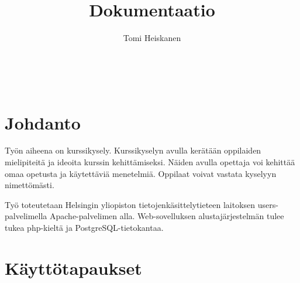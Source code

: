\documentclass[12pt,twoside,a4paper,leqno,titlepage]{article}
\title{Dokumentaatio}
\author{Tomi Heiskanen}
\begin{document}
\maketitle

\ 
\thispagestyle{empty}
\newpage

\setcounter{page}{1}
\tableofcontents
\thispagestyle{empty}

\newpage
\section{Johdanto}

Työn aiheena on kurssikysely. Kurssikyselyn avulla kerätään oppilaiden
mielipiteitä ja ideoita kurssin kehittämiseksi. Näiden avulla opettaja voi
kehittää omaa opetusta ja käytettäviä menetelmiä. Oppilaat voivat vastata
kyselyyn nimettömästi.

Työ toteutetaan Helsingin yliopiston tietojenkäsittelytieteen laitoksen users-
palvelimella Apache-palvelimen alla. Web-sovelluksen alustajärjestelmän tulee
tukea php-kieltä ja PostgreSQL-tietokantaa.

\section{Käyttötapaukset}
\end{document}
